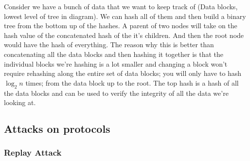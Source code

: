 \documentclass[../notes.tex]{subfiles}
\begin{document}
\begin{blockquote}
   Consider we have a bunch of data that we want to keep track of (Data blocks, lowest level of tree in diagram). We can hash all of them and then build a binary tree from the bottom up of the hashes. A parent of two nodes will take on the hash value of the concatenated hash of the it's children. And then the root node would have the hash of everything. The reason why this is better than concatenating all the data blocks and then hashing it together is that the individual blocks we're hashing is a lot smaller and changing a block won't require rehashing along the entire set of data blocks; you will only have to hash $ \log_2 n $ times; from the data block up to the root. 
   The top hash is a hash of all the data blocks and can be used to verify the integrity of all the data we're looking at.

\end{blockquote}


\subsection{Attacks on protocols}

\subsubsection{Replay Attack}
\end{document}
